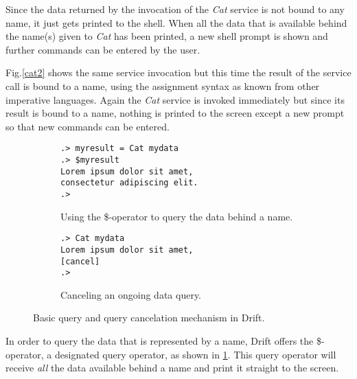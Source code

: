 Since the data returned by the invocation of the \textit{Cat} service is
not bound to any name, it just gets printed to the shell. When all
the data that is available behind the name(s) given to \textit{Cat} has been
printed, a new shell prompt is shown and further commands can be entered
by the user.

Fig.\ref{cat2} shows the same service invocation but this time the
result of the service call is bound to a name, using the assignment
syntax as known from other imperative languages. Again the
\textit{Cat} service is invoked immediately but since its result
is bound to a name, nothing is printed to the screen except a new
prompt so that new commands can be entered.

\begin{figure}[h]
    \centering
    \begin{subfigure}[b]{0.4\textwidth}

  \begin{lstlisting}
.> myresult = Cat mydata
.> $myresult
Lorem ipsum dolor sit amet,
consectetur adipiscing elit.
.>
  \end{lstlisting}

        \caption{Using the \$-operator to query the data behind a name.}
        \label{cat3}
    \end{subfigure}
    \hspace{20pt} %
    \begin{subfigure}[b]{0.4\textwidth}

  \begin{lstlisting}
.> Cat mydata
Lorem ipsum dolor sit amet,
[cancel]
.>
  \end{lstlisting}

        \caption{Canceling an ongoing data query.\\}
        \label{cat4}
    \end{subfigure}
    \caption{Basic query and query cancelation mechanism in Drift.}\label{drift-examples2}
\end{figure}

In order to query the data that is represented by a name, Drift offers
the \$-operator, a designated query operator, as shown in \ref{cat3}.
This query operator will receive \textit{all} the data available
behind a name and print it straight to the screen.

